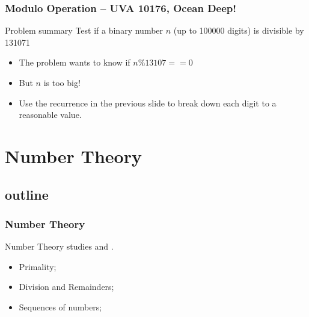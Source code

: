 \documentclass{beamer}
\begin{document}
\begin{frame}
  \frametitle{Modulo Operation -- UVA 10176, Ocean Deep!}
  {\smaller
  \begin{block}{Problem summary}
    Test if a binary number $n$ (up to 100000 digits) is divisible by 131071
  \end{block}

  \begin{itemize}
  \item The problem wants to know if $n\%13107 == 0$
  \item But $n$ is too big!

  \item Use the recurrence in the previous slide to break down each
    digit to a reasonable value.
  \end{itemize}}

\end{frame}


\section{Number Theory}
\subsection{outline}
\begin{frame}
  \frametitle{Number Theory} {\small

    Number Theory studies  and
    .

    \bigskip

    \begin{itemize}
    \item Primality;
    \item Division and Remainders;
    \item Sequences of numbers;
    \end{itemize}

    }
\end{frame}
\end{document}
